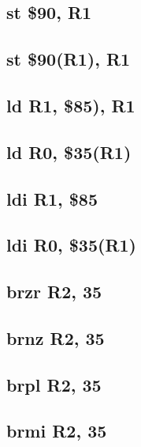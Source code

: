 \documentclass{article}
\begin{document}
    \subsection{st \$90, R1} \label{st_case_1_sequence}
        
    \subsection{st \$90(R1), R1} \label{st_case_2_sequence}
        
    \subsection{ld R1, \$85), R1} \label{ld_case_1_sequence}
        
    \subsection{ld R0, \$35(R1)} \label{ld_case_2_sequence}
        
    \subsection{ldi R1, \$85} \label{ldi_case_3_sequence}
        
    \subsection{ldi R0, \$35(R1)} \label{ldi_case_4_sequence}
        
    \subsection{brzr R2, 35} \label{brzr_sequence}
        
    \subsection{brnz R2, 35} \label{brnz_sequence}
        
    \subsection{brpl R2, 35} \label{brpl_sequence}
        
    \subsection{brmi R2, 35} \label{brmi_sequence}
        
\end{document}
